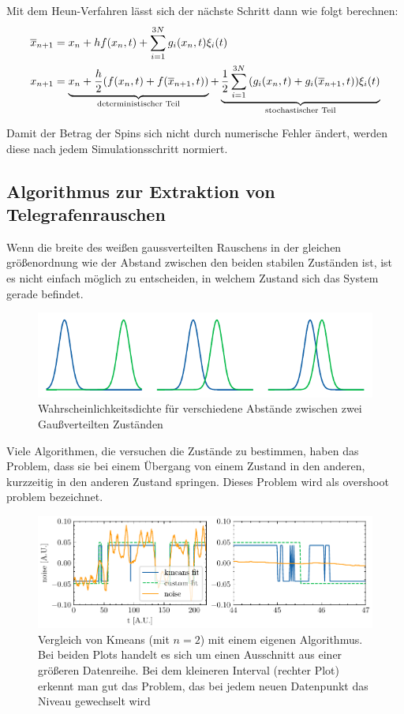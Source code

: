 \documentclass[main.tex]{subfiles}
\begin{document}
Mit dem Heun-Verfahren lässt sich der nächste Schritt dann wie folgt berechnen:
\begin{align}
    \overline{x}_{n+1} &= x_n + h f(x_n,t) + \sum_{i=1}^{3N} g_i(x_n,t) \xi_i(t) \\
    x_{n+1} &= \underbrace{x_n + \frac{h}{2} \qty(f(x_n,t) + f(\overline{x}_{n+1},t))}_\text{deterministischer Teil} + \underbrace{\frac{1}{2} \sum_{i=1}^{3N} \qty(g_i(x_n,t) + g_i(\overline{x}_{n+1},t)) \xi_i(t)}_\text{stochastischer Teil}
\end{align}

Damit der Betrag der Spins sich nicht durch numerische Fehler ändert, werden diese nach jedem Simulationsschritt normiert.

\subsection{Algorithmus zur Extraktion von Telegrafenrauschen}\label{algo}

Wenn die breite des weißen gaussverteilten Rauschens in der gleichen größenordnung wie der Abstand zwischen den beiden stabilen Zuständen ist, ist es nicht einfach möglich zu entscheiden, in welchem Zustand sich das System gerade befindet.
\begin{figure}[h]
    \centering
    \includegraphics{bilder/plots/theo-vis/gauss-overlap.pdf}
    \caption{Wahrscheinlichkeitsdichte für verschiedene Abstände zwischen zwei Gaußverteilten Zuständen \label{fig:gauss-overlap}}
\end{figure}

Viele Algorithmen, die versuchen die Zustände zu bestimmen, haben das Problem, dass sie bei einem Übergang von einem Zustand in den anderen, kurzzeitig in den anderen Zustand springen. Dieses Problem wird als overshoot problem bezeichnet. 

\begin{figure}[h]
    \centering
    \includegraphics{bilder/plots/theo-vis/telegraph_fit_comp.pdf}
    \caption{Vergleich von Kmeans (mit \(n=2\)) mit einem eigenen Algorithmus. Bei beiden Plots handelt es sich um einen Ausschnitt aus einer größeren Datenreihe. Bei dem kleineren Interval (rechter Plot) erkennt man gut das Problem, das bei jedem neuen Datenpunkt das Niveau gewechselt wird}\label{fig:fit_comp}
\end{figure}
\end{document}
